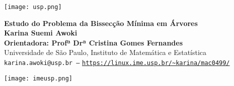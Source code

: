 \documentclass[a0,portrait]{a0poster}
\begin{document}


\begin{minipage}[b]{0.15\linewidth}
\texttt{[image: usp.png]}\\
\end{minipage}
\begin{minipage}[b]{0.70\linewidth}
\VeryHuge \center \color{NavyBlue} \textbf{Estudo do Problema da Bissecção Mínima em Árvores} \color{Black}\\ %
[0.7cm]
\huge \textbf{Karina Suemi Awoki}\\[0.5cm] %
\huge \textbf{Orientadora: Profª Drª Cristina Gomes Fernandes}\\[0.5cm] %

\huge Universidade de São Paulo, Instituto de Matemática e Estatística\\[0.2cm] %
\Large \texttt{karina.awoki@usp.br ---} 
\Large \texttt{\url{https://linux.ime.usp.br/~karina/mac0499/}}\\
\end{minipage}
%
\begin{minipage}[b]{0.15\linewidth}
\texttt{[image: imeusp.png]}\\
\end{minipage}

\vspace{1.cm} %

\end{document}
